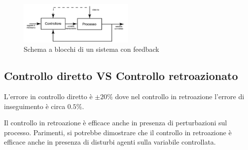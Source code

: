 \begin{figure}[!ht]
	\centering
	\includegraphics[width=0.5\textwidth]{./images/feedback.png}
	\caption{Schema a blocchi di un sistema con feedback}
	\label{fig:feedback}
\end{figure}


\subsection{Controllo diretto VS Controllo retroazionato}

L'errore in controllo diretto è $\pm 20 \%$ dove nel controllo in retroazione l'errore di inseguimento è circa $0.5\%$.

Il controllo in retroazione è efficace anche in presenza di perturbazioni sul processo. Parimenti, si potrebbe dimostrare che il controllo in retroazione è efficace anche in presenza di disturbi agenti sulla variabile controllata.


